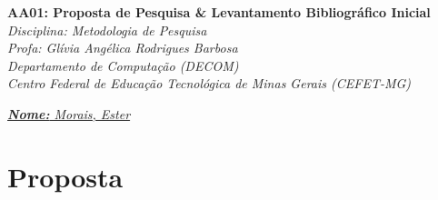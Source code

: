 \documentclass[12pt, a4paper]{article}
\begin{document}

\begin{center}
{\large\bfseries AA01: Proposta de Pesquisa \& Levantamento Bibliográfico Inicial}\\[0.3em]
\textit{Disciplina: Metodologia de Pesquisa}\\
\textit{Profa: Glívia Angélica Rodrigues Barbosa}\\
\textit{Departamento de Computação (DECOM)}\\
\textit{Centro Federal de Educação Tecnológica de Minas Gerais (CEFET-MG)}
\end{center}

\vspace{0.8em}
\underline{\textit{\textbf{Nome:} Morais, Ester}}

\vspace{1em}

\section{Proposta}
\end{document}
